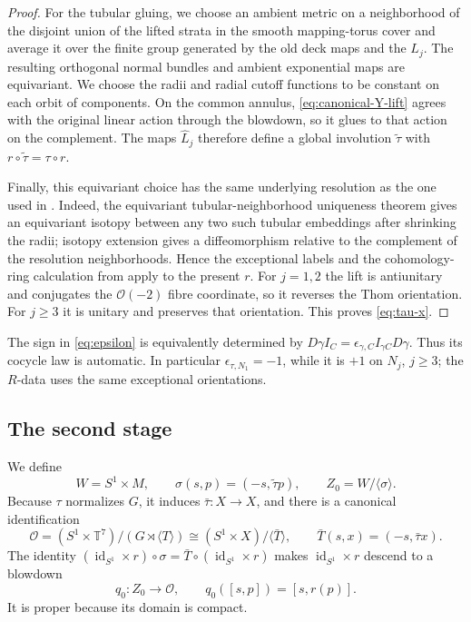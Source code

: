 \documentclass[11pt]{article}
\theoremstyle{remark}\newtheorem{remark}[theorem]{Remark}
\newcommand{\T}{\mathbb T}
\newcommand{\id}{\operatorname{id}}
\begin{document}
\begin{proof}
For the tubular gluing, we choose an ambient metric on a neighborhood of
the disjoint union of the lifted strata in the smooth mapping-torus cover
and average it over the finite group generated by the old deck maps and
the $L_j$.  The resulting orthogonal normal bundles and ambient
exponential maps are equivariant.  We choose the radii and radial cutoff
functions to be constant on each orbit of components.
On the common annulus, \eqref{eq:canonical-Y-lift} agrees with the original
linear action through the blowdown, so it glues to that action on the
complement.  The maps $\widehat L_j$ therefore define a global involution
$\widetilde\tau$ with $r\circ\widetilde\tau=\tau\circ r$.

Finally, this equivariant choice has the same underlying resolution as the
one used in \cite{MM}.  Indeed, the equivariant tubular-neighborhood
uniqueness theorem \cite[Chapter VI]{BredonGroup} gives an equivariant
isotopy between any two such tubular embeddings after shrinking the radii;
isotopy extension \cite[Chapter 8]{Hirsch} gives a
diffeomorphism relative to the complement of the resolution
neighborhoods.  Hence the exceptional labels and the cohomology-ring
calculation from \cite{MM} apply to the present $r$.  For $j=1,2$ the lift
is antiunitary and conjugates the $\mathcal O(-2)$ fibre coordinate, so it
reverses the Thom orientation.  For $j\geq3$ it is unitary and preserves
that orientation.  This proves \eqref{eq:tau-x}.
\end{proof}

The sign in \eqref{eq:epsilon} is equivalently determined by
$D\gamma I_C=\epsilon_{\gamma,C}I_{\gamma C}D\gamma$.  Thus its cocycle law
is automatic.  In particular $\epsilon_{\tau,N_1}=-1$, while it is $+1$ on
$N_j$, $j\ge3$; the $R$-data uses the same exceptional orientations.

\subsection{The second stage}
We define
\begin{equation}\label{eq:W-Z0}
W=S^1\times M,\qquad \sigma(s,p)=(-s,\widetilde\tau p),\qquad
Z_0=W/\langle\sigma\rangle.
\end{equation}
Because $\tau$ normalizes $G$, it induces $\bar\tau:X\to X$, and there is a
canonical identification
\[
\mathcal O=(S^1\times\T^7)/(G\rtimes\langle T\rangle)
\cong(S^1\times X)/\langle\bar T\rangle,
\qquad \bar T(s,x)=(-s,\bar\tau x).
\]
The identity
$(\id_{S^1}\times r)\circ\sigma
=\bar T\circ(\id_{S^1}\times r)$ makes
$\id_{S^1}\times r$ descend to a blowdown
\begin{equation}\label{eq:q0}
q_0:Z_0\longrightarrow\mathcal O,\qquad
q_0([s,p])=[s,r(p)].
\end{equation}
It is proper because its domain is compact.
\end{document}
